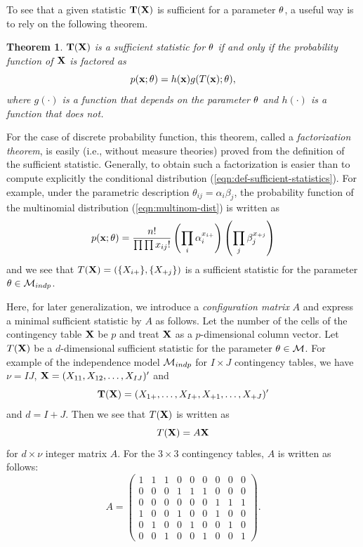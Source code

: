 \documentclass[12pt]{article}
\newtheorem{Theorem}{Theorem}[section]
\theoremstyle{definition}
\def\Bx{{\bf x}}
\def\BX{{\bf X}}
\def\BT{{\bf T}}
\def\Btheta{{\bf \theta}}
\begin{document}
To see that a given statistic $\BT(\BX)$ is sufficient for a parameter
$\Btheta$, a useful way is to rely on the following theorem.
\begin{Theorem}
$\BT(\BX)$ is a sufficient statistic for $\Btheta$ if and only if the
 probability function of $\BX$ is factored as
\begin{equation}
 p(\Bx; \Btheta) = h(\Bx)g(T(\Bx); \Btheta),
\label{eqn:factorization-thm}
\end{equation}
where $g(\cdot)$ is a function that depends on the parameter $\Btheta$
 and $h(\cdot)$ is a function that does not.
\end{Theorem}
For the case of discrete probability function, this theorem, called a
{\it factorization theorem}, is easily (i.e., without measure theories) proved
from the definition of the sufficient statistic. 
Generally, to obtain such a factorization is easier than to compute
explicitly the conditional distribution
(\ref{eqn:def-sufficient-statistics}). 
For example, under the parametric description $\theta_{ij} =
\alpha_i\beta_j$, the probability function of the multinomial distribution 
(\ref{eqn:multinom-dist}) is written as
\[
 p(\Bx; \Btheta) = 
\frac{n!}{\prod\prod x_{ij}!}\left(\prod_i
 \alpha_i^{x_{i+}}\right)\left(\prod_j\beta_j^{x_{+j}}\right) 
\]
and we see that $T(\BX) = (\{X_{i+}\}, \{X_{+j}\})$ is a sufficient
statistic for the parameter $\Btheta \in {\cal M}_{indp}$. 

Here, for later generalization, we introduce a {\it configuration
matrix} $A$ and express a minimal sufficient statistic by $A$ as
follows. Let the number of the cells of the contingency table $\BX$ be
$p$ and treat $\BX$ as a $p$-dimensional column vector. 
Let $T(\BX)$ be a $d$-dimensional sufficient statistic for the
parameter $\Btheta \in {\cal M}$. 
For example of the independence model ${\cal M}_{indp}$ for $I\times J$
contingency tables, we have 
$\nu = IJ$, $\BX = (X_{11}, X_{12}, \ldots, X_{IJ})'$ and 
\[
\BT(\BX) = (X_{1+}, \ldots, X_{I+}, X_{+1}, \ldots, X_{+J})' 
\]
and $d = I + J$. Then we see that $T(\BX)$ is written as
\begin{equation}
 T(\BX) = A\BX
\label{eqn:t=Ax}
\end{equation}
for $d\times \nu$ integer matrix $A$. For the $3\times 3$ contingency
tables, $A$ is written as follows:
\begin{equation}
 A = \left(\begin{array}{ccccccccc}
1 & 1 & 1 & 0 & 0 & 0 & 0 & 0 & 0\\
0 & 0 & 0 & 1 & 1 & 1 & 0 & 0 & 0\\
0 & 0 & 0 & 0 & 0 & 0 & 1 & 1 & 1\\
1 & 0 & 0 & 1 & 0 & 0 & 1 & 0 & 0\\
0 & 1 & 0 & 0 & 1 & 0 & 0 & 1 & 0\\
0 & 0 & 1 & 0 & 0 & 1 & 0 & 0 & 1
\end{array}\right).
\label{eqn:A-3x3-indp}
\end{equation}
\end{document}

